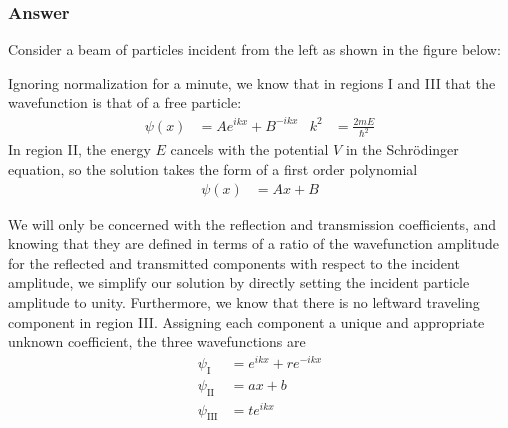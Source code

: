 \subsubsection{Answer}

Consider a beam of particles incident from the left as shown in the figure
below:
\begin{figure}[H]
    \centering
\end{figure}

Ignoring normalization for a minute, we know that in regions I and III that
the wavefunction is that of a free particle:
\begin{align*}
    \psi (x) &= Ae^{ikx} + B^{-ikx}
        & k^2 &= \frac{2mE}{{\hbar}^2}
\end{align*}
In region II, the energy $E$ cancels with the potential $V$ in the Schr\"odinger
equation, so the solution takes the form of a first order polynomial
\begin{align*}
    \psi (x) &= Ax + B
\end{align*}

We will only be concerned with the reflection and transmission coefficients,
and knowing that they are defined in terms of a ratio of the wavefunction
amplitude for the reflected and transmitted components with respect to the
incident amplitude, we simplify our solution by directly setting the incident
particle amplitude to unity. Furthermore, we know that there is no leftward
traveling component in region III. Assigning each component a unique and
appropriate unknown coefficient, the three wavefunctions are
\begin{align*}
    \psi _{\text{I}} &= e^{ikx} + re^{-ikx}\\
    \psi _{\text{II}} &= ax + b\\
    \psi _{\text{III}} &= te^{ikx}
\end{align*}

